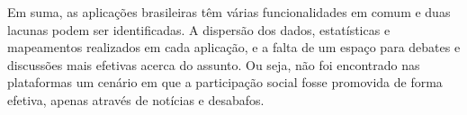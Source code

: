 Em suma, as aplicações brasileiras têm várias funcionalidades em comum e duas lacunas podem ser identificadas. 
A dispersão dos dados, estatísticas e mapeamentos realizados em cada aplicação, e a falta de um espaço para debates e discussões 
mais efetivas acerca do assunto. Ou seja, não foi encontrado nas plataformas um cenário em que a participação social fosse promovida
de forma efetiva, apenas através de notícias e desabafos. %


